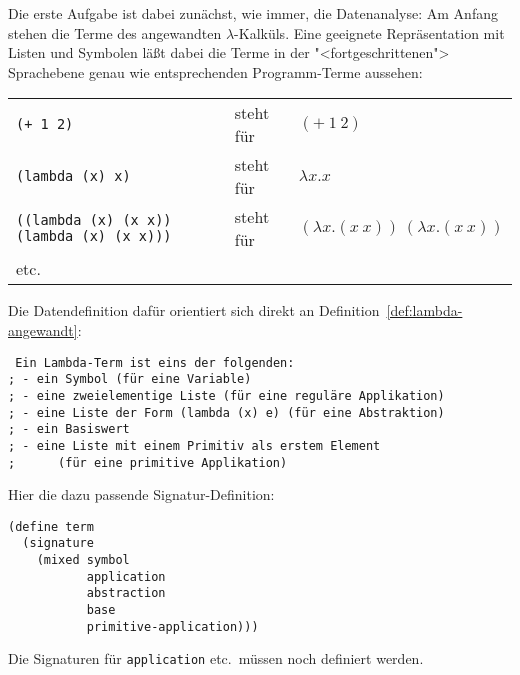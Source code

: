 Die erste Aufgabe ist dabei zunächst, wie immer, die Datenanalyse: Am
Anfang stehen die Terme des angewandten $\lambda$-Kalküls.  Eine
geeignete Repräsentation mit Listen und Symbolen läßt dabei die Terme
in der "<fortgeschrittenen"> Sprachebene genau wie entsprechenden
Programm-Terme aussehen:

\noindent\begin{tabular}{lll}
  \texttt{(+ 1 2)} & steht für & $(+~1~2)$\\
  \texttt{(lambda (x) x)} & steht für & $\lambda x.x$\\
  \texttt{((lambda (x) (x x)) (lambda (x) (x x)))} & steht für &
  $(\lambda x.(x~x))~(\lambda x.(x~x))$\\
  etc.
\end{tabular}

Die Datendefinition dafür orientiert sich direkt an
Definition~\ref{def:lambda-angewandt}:
%
\begin{verbatim}
 Ein Lambda-Term ist eins der folgenden:
; - ein Symbol (für eine Variable)
; - eine zweielementige Liste (für eine reguläre Applikation)
; - eine Liste der Form (lambda (x) e) (für eine Abstraktion)
; - ein Basiswert
; - eine Liste mit einem Primitiv als erstem Element
;      (für eine primitive Applikation)
\end{verbatim}
%
Hier die dazu passende Signatur-Definition:
%
\begin{verbatim}
(define term
  (signature
    (mixed symbol
           application
           abstraction
           base
           primitive-application)))
\end{verbatim}
%
Die Signaturen für \texttt{application} etc.\ müssen noch definiert
werden.

